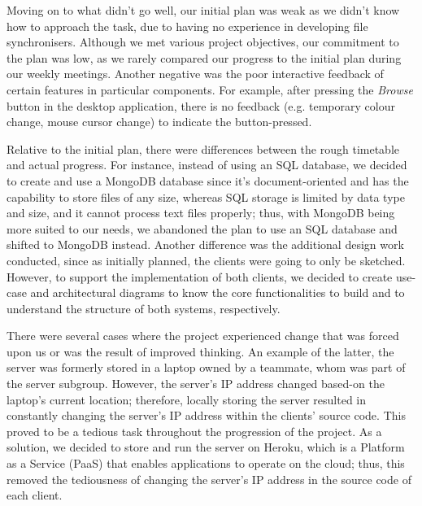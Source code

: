 \documentclass{article}
\begin{document}
\noindent Moving on to what didn't go well, our initial plan was weak as we didn't know how to approach the task, due to having no experience in developing file synchronisers. Although we met various project objectives, our commitment to the plan was low, as we rarely compared our progress to the initial plan during our weekly meetings. Another negative was the poor interactive feedback of certain features in particular components. For example, after pressing the \textit{Browse} button in the desktop application, there is no feedback (e.g. temporary colour change, mouse cursor change) to indicate the button-pressed.

\noindent Relative to the initial plan, there were differences between the rough timetable and actual progress. For instance, instead of using an SQL database, we decided to create and use a MongoDB database since it's document-oriented and has the capability to store files of any size, whereas SQL storage is limited by data type and size, and it cannot process text files properly; thus, with MongoDB being more suited to our needs, we abandoned the plan to use an SQL database and shifted to MongoDB instead. Another difference was the additional design work conducted, since as initially planned, the clients were going to only be sketched. However, to support the implementation of both clients, we decided to create use-case and architectural diagrams to know the core functionalities to build and to understand the structure of both systems, respectively.

\noindent There were several cases where the project experienced change that was forced upon us or was the result of improved thinking. An example of the latter, the server was formerly stored in a laptop owned by a teammate, whom was part of the server subgroup. However, the server's IP address changed based-on the laptop's current location; therefore, locally storing the server resulted in constantly changing the server's IP address within the clients' source code. This proved to be a tedious task throughout the progression of the project. As a solution, we decided to store and run the server on Heroku, which is a Platform as a Service (PaaS) that enables applications to operate on the cloud; thus, this removed the tediousness of changing the server's IP address in the source code of each client.
\end{document}
